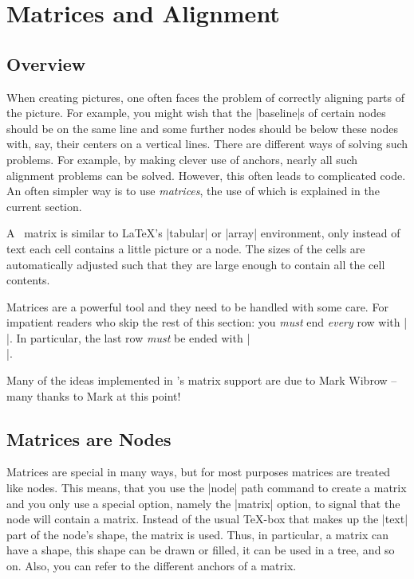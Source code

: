 %
%
%


\section{Matrices and Alignment}
\label{section-matrices}

\subsection{Overview}

When creating pictures, one often faces the problem of correctly aligning parts
of the picture. For example, you might wish that the |baseline|s of certain
nodes should be on the same line and some further nodes should be below these
nodes with, say, their centers on a vertical lines. There are different ways of
solving such problems. For example, by making clever use of anchors, nearly all
such alignment problems can be solved. However, this often leads to complicated
code. An often simpler way is to use \emph{matrices}, the use of which is
explained in the current section.

A \tikzname\ matrix is similar to \LaTeX's |{tabular}| or |{array}|
environment, only instead of text each cell contains a little picture or a
node. The sizes of the cells are automatically adjusted such that they are
large enough to contain all the cell contents.

Matrices are a powerful tool and they need to be handled with some care. For
impatient readers who skip the rest of this section: you \emph{must} end
\emph{every} row with |\\|. In particular, the last row \emph{must} be ended
with |\\|.

Many of the ideas implemented in \tikzname's matrix support are due to Mark
Wibrow -- many thanks to Mark at this point!


\subsection{Matrices are Nodes}

Matrices are special in many ways, but for most purposes matrices are treated
like nodes. This means, that you use the |node| path command to create a matrix
and you only use a special option, namely the |matrix| option, to signal that
the node will contain a matrix. Instead of the usual \TeX-box that makes up the
|text| part of the node's shape, the matrix is used. Thus, in particular, a
matrix can have a shape, this shape can be drawn or filled, it can be used in a
tree, and so on. Also, you can refer to the different anchors of a matrix.

